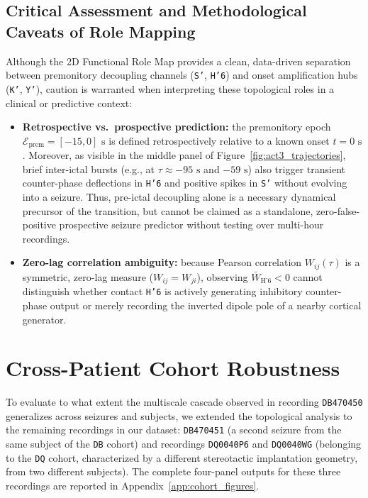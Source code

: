 \subsection{Critical Assessment and Methodological Caveats of Role Mapping}
Although the 2D Functional Role Map provides a clean, data-driven separation between premonitory decoupling channels (\texttt{S'}, \texttt{H'6}) and onset amplification hubs (\texttt{K'}, \texttt{Y'}), caution is warranted when interpreting these topological roles in a clinical or predictive context:
\begin{itemize}
    \item \textbf{Retrospective vs.\ prospective prediction:} the premonitory epoch $\mathcal{E}_{\text{prem}} = [-15, 0]\text{ s}$ is defined retrospectively relative to a known onset $t = 0\text{ s}$. Moreover, as visible in the middle panel of Figure~\ref{fig:act3_trajectories}, brief inter-ictal bursts (e.g., at $\tau \approx -95\text{ s}$ and $-59\text{ s}$) also trigger transient counter-phase deflections in \texttt{H'6} and positive spikes in \texttt{S'} without evolving into a seizure. Thus, pre-ictal decoupling alone is a necessary dynamical precursor of the transition, but cannot be claimed as a standalone, zero-false-positive prospective seizure predictor without testing over multi-hour recordings.
    \item \textbf{Zero-lag correlation ambiguity:} because Pearson correlation $W_{ij}(\tau)$ is a symmetric, zero-lag measure ($W_{ij} = W_{ji}$), observing $\bar{W}_{\text{H'6}} < 0$ cannot distinguish whether contact \texttt{H'6} is actively generating inhibitory counter-phase output or merely recording the inverted dipole pole of a nearby cortical generator.
\end{itemize}

\section{Cross-Patient Cohort Robustness}
\label{sec:cohort_robustness}

To evaluate to what extent the multiscale cascade observed in recording \texttt{DB470450} generalizes across seizures and subjects, we extended the topological analysis to the remaining recordings in our dataset: \texttt{DB470451} (a second seizure from the same subject of the \texttt{DB} cohort) and recordings \texttt{DQ0040P6} and \texttt{DQ0040WG} (belonging to the \texttt{DQ} cohort, characterized by a different stereotactic implantation geometry, from two different subjects). The complete four-panel outputs for these three recordings are reported in Appendix~\ref{app:cohort_figures}.

